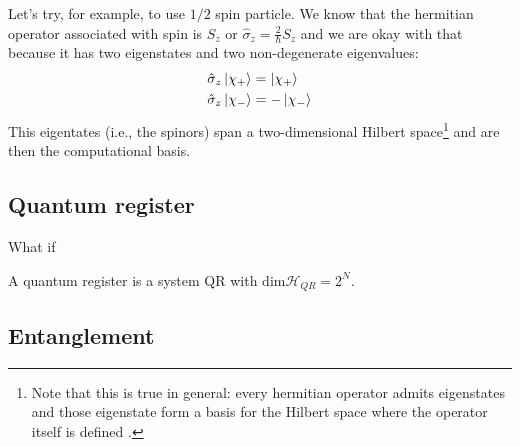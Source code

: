 Let's try, for example, to use $1/2$ spin particle. We know that the hermitian operator associated with spin is $S_z$ or $\hat{\sigma}_z = \frac{2}{\hbar} S_z$ and we are okay with that because it has two eigenstates and two non-degenerate eigenvalues:
\begin{align*}
    &\hat{\sigma}_z \ket{\chi_+} = \ket{\chi_+}  \\
    &\hat{\sigma}_z \ket{\chi_-} = -\ket{\chi_-}
\end{align*}
This eigentates (i.e., the spinors) span a two-dimensional Hilbert space\footnote{Note that this is true in general: every hermitian operator admits eigenstates and those eigenstate form a basis for the Hilbert space where the operator itself is defined \cite[p.100]{Shankar}.} and are then the computational basis.
\subsection{Quantum register}
What if 
\begin{defn}
A quantum register is a system QR  with $\text{dim}\mathcal{H}_{QR} = 2^N$.
\end{defn}
\subsection{Entanglement}